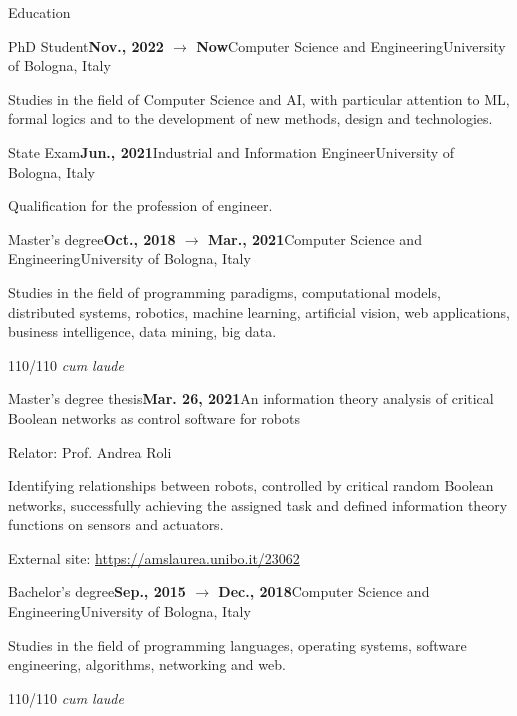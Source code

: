 \documentclass{resume} %
\begin{document}
    \begin{rSection}{Education}
        
        \begin{rSubsection}{PhD Student}{\textbf{Nov., 2022 $\rightarrow$ Now}}{Computer Science and Engineering}{University of Bologna, Italy}
            \item Studies in the field of Computer Science and AI, with particular attention to ML, formal logics and to the development of new methods, design and technologies.
        \end{rSubsection}
        
        \begin{rSubsection}{State Exam}{\textbf{Jun., 2021}}{Industrial and Information Engineer}{University of Bologna, Italy}
            \item Qualification for the profession of engineer.
        \end{rSubsection}
        
        \begin{rSubsection}{Master's degree}{\textbf{Oct., 2018 $\rightarrow$ Mar., 2021}}{Computer Science and Engineering}{University of Bologna, Italy}
            \item Studies in the field of programming paradigms, computational models, distributed systems, robotics, machine learning, artificial vision, web applications, business intelligence, data mining, big data.
            
            \item 110/110 \emph{cum laude}
        \end{rSubsection}
        \begin{rSubsection}{Master's degree thesis}{\textbf{Mar. 26, 2021}}{An information theory analysis of critical Boolean networks as control software for robots}{\begin{flushright}
                    Relator: Prof. Andrea Roli
            \end{flushright}}
            \item Identifying relationships between robots, controlled by critical random Boolean networks, successfully achieving the assigned task and defined information theory functions on sensors and actuators.
            
            \item External site: \url{https://amslaurea.unibo.it/23062}
        \end{rSubsection}
        \begin{rSubsection}{Bachelor's degree}{\textbf{Sep., 2015 $\rightarrow$ Dec., 2018}}{Computer Science and Engineering}{University of Bologna, Italy}
            \item Studies in the field of programming languages, operating systems, software engineering, algorithms, networking and web.
            \item 110/110 \emph{cum laude}
        \end{rSubsection}
        

\end{rSection}
\end{document}
